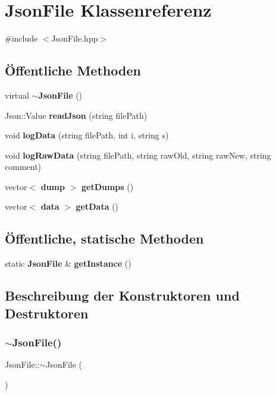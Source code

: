 \section{Json\+File Klassenreferenz}
\label{class_json_file}


{\ttfamily \#include $<$Json\+File.\+hpp$>$}

\subsection*{Öffentliche Methoden}
\begin{DoxyCompactItemize}
\item 
virtual \textbf{ $\sim$\+Json\+File} ()
\item 
Json\+::\+Value \textbf{ read\+Json} (string file\+Path)
\item 
void \textbf{ log\+Data} (string file\+Path, int i, string s)
\item 
void \textbf{ log\+Raw\+Data} (string file\+Path, string raw\+Old, string raw\+New, string comment)
\item 
vector$<$ \textbf{ dump} $>$ \textbf{ get\+Dumps} ()
\item 
vector$<$ \textbf{ data} $>$ \textbf{ get\+Data} ()
\end{DoxyCompactItemize}
\subsection*{Öffentliche, statische Methoden}
\begin{DoxyCompactItemize}
\item 
static \textbf{ Json\+File} \& \textbf{ get\+Instance} ()
\end{DoxyCompactItemize}


\subsection{Beschreibung der Konstruktoren und Destruktoren}
\mbox{\label{class_json_file_a3a821a767cdf009865b519527731a007}} 
\subsubsection{$\sim$\+Json\+File()}
{\footnotesize\ttfamily Json\+File\+::$\sim$\+Json\+File (\begin{DoxyParamCaption}{ }\end{DoxyParamCaption})\hspace{0.3cm}{\ttfamily [virtual]}}



